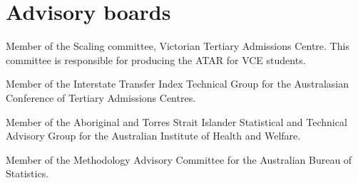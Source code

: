 \documentclass[a4paper,10pt]{article}
\begin{document}
\section{Advisory boards}

\begin{compactitem}
\item Member of the Scaling committee, Victorian Tertiary Admissions Centre. This committee is responsible for producing the ATAR for VCE students.
\item Member of the Interstate Transfer Index Technical Group for the Australasian Conference of Tertiary Admissions Centres.
\item Member of the Aboriginal and Torres Strait Islander Statistical and Technical Advisory Group for the Australian Institute of Health and Welfare.
\item Member of the Methodology Advisory Committee for the Australian Bureau of Statistics.
\end{compactitem}

\enlargethispage*{0.9cm}

\setlength{\bibitemsep}{1.8pt}

\end{document}
